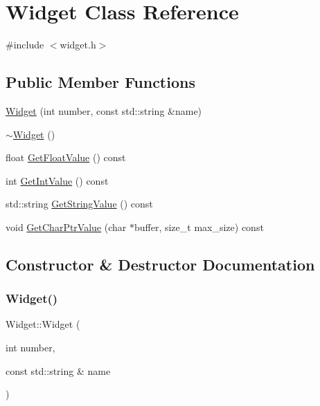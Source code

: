 \hypertarget{classWidget}{}\section{Widget Class Reference}
\label{classWidget}


{\ttfamily \#include $<$widget.\+h$>$}

\subsection*{Public Member Functions}
\begin{DoxyCompactItemize}
\item 
\mbox{\hyperlink{classWidget_ab573b75a8a69d29c298af2485fb9cda9}{Widget}} (int number, const std\+::string \&name)
\item 
\mbox{\hyperlink{classWidget_aa24f66bcbaaec6d458b0980e8c8eae65}{$\sim$\+Widget}} ()
\item 
float \mbox{\hyperlink{classWidget_abf639d975e02cabda8132873aca1a333}{Get\+Float\+Value}} () const
\item 
int \mbox{\hyperlink{classWidget_a15e7d0423020a7a98063a749fb97bdd3}{Get\+Int\+Value}} () const
\item 
std\+::string \mbox{\hyperlink{classWidget_a7a6e3a7fca3a9373f631c94dc1494d22}{Get\+String\+Value}} () const
\item 
void \mbox{\hyperlink{classWidget_a50791a556979f22f5593383143c7f815}{Get\+Char\+Ptr\+Value}} (char $\ast$buffer, size\+\_\+t max\+\_\+size) const
\end{DoxyCompactItemize}


\subsection{Constructor \& Destructor Documentation}
\mbox{\label{classWidget_ab573b75a8a69d29c298af2485fb9cda9}} 
\subsubsection{\texorpdfstring{Widget()}{Widget()}}
{\footnotesize\ttfamily Widget\+::\+Widget (\begin{DoxyParamCaption}\item[{int}]{number,  }\item[{const std\+::string \&}]{name }\end{DoxyParamCaption})}


